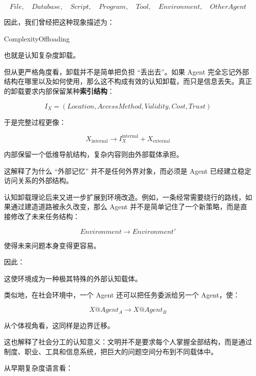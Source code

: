 \[
File,\quad
Database,\quad
Script,\quad
Program,\quad
Tool,\quad
Environment,\quad
OtherAgent
\]

因此，我们曾经把这种现象描述为：

\begin{statementbox}
ComplexityOffloading
\end{statementbox}

也就是认知复杂度卸载。

但从更严格角度看，卸载并不是简单把负担 ``丢出去''。如果 Agent 完全忘记外部结构在哪里以及如何使用，那么这不构成有效的认知卸载，而只是信息丢失。真正的卸载要求内部保留某种\textbf{索引结构}：

\[
I_X
=
(
Location,
AccessMethod,
Validity,
Cost,
Trust
)
\]

于是完整过程更像：

\[
X_{\mathrm{internal}}
\rightarrow
I_X^{\mathrm{internal}}
+
X_{\mathrm{external}}
\]

内部保留一个低维导航结构，复杂内容则由外部载体承担。

这解释了为什么 ``外部记忆'' 并不是任何外界对象，而必须是 Agent 已经建立稳定访问关系的外部结构。

认知卸载理论后来又进一步扩展到环境改造。例如，一条经常需要绕行的路线，如果通过建造道路被永久改变，那么 Agent 并不是简单记住了一个新策略，而是直接修改了未来任务结构：

\[
Environment
\rightarrow
Environment'
\]

使得未来问题本身变得更容易。

因此：

\begin{statementbox}
\centering
{}
\end{statementbox}

这使环境成为一种极其特殊的外部认知载体。

类似地，在社会环境中，一个 Agent 还可以把任务委派给另一个 Agent，使：

\[
X@Agent_A
\rightarrow
X@Agent_B
\]

从个体视角看，这同样是边界迁移。

这也解释了社会分工的认知意义：文明并不是要求每个人掌握全部结构，而是通过制度、职业、工具和信息系统，把巨大的问题空间分布到不同载体中。

从早期复杂度语言看：

\begin{statementbox}
\centering
{}
\end{statementbox}

